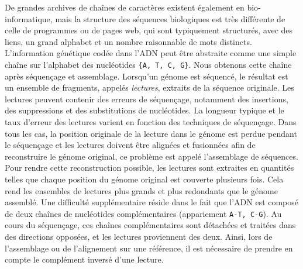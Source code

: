 De grandes archives de chaînes de caractères existent également en bio-informatique, mais la structure des séquences biologiques est très différente de celle de programmes ou de pages web, qui sont typiquement structurés, avec des liens, un grand alphabet et un nombre raisonnable de mots distincts.
L'information génétique codée dans l'ADN peut être abstraite comme une simple chaîne sur l'alphabet des nucléotides \texttt{\{A, T, C, G\}}.
Nous obtenons cette chaîne après séquençage et assemblage. Lorsqu'un génome est séquencé, le résultat est un ensemble de fragments, appelés \emph{lectures}, extraits de la séquence originale. Les lectures peuvent contenir des erreurs de séquençage, notamment des insertions, des suppressions et des substitutions de nucléotides. La longueur typique et le taux d'erreur des lectures varient en fonction des techniques de séquençage.
%
Dans tous les cas, la position originale de la lecture dans le génome est perdue pendant le séquençage et les lectures doivent être alignées et fusionnées afin de reconstruire le génome original, ce problème est appelé l'assemblage de séquences. Pour rendre cette reconstruction possible, les lectures sont extraites en quantités telles que chaque position du génome original est couverte plusieurs fois. Cela rend les ensembles de lectures plus grands et plus redondants que le génome assemblé. 
Une difficulté supplémentaire réside dans le fait que l'ADN est composé de deux chaînes de nucléotides complémentaires (appariement \texttt{A-T, C-G}). Au cours du séquençage, ces chaînes complémentaires sont détachées et traitées dans des directions opposées, et les lectures proviennent des deux. Ainsi, lors de l'assemblage ou de l'alignement sur une référence, il est nécessaire de prendre en compte le complément inversé d'une lecture.


